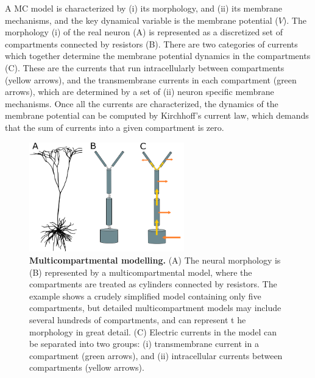 A MC model is characterized by (i) its morphology, and (ii) its membrane mechanisms, and the key dynamical variable is the membrane potential ($V$). The morphology (i) of the real neuron (A) is represented as a discretized set of compartments connected by resistors (B). There are two categories of currents which together determine the membrane potential dynamics in the compartments (C). These are the currents that run intracellularly between compartments (yellow arrows), and the transmembrane currents in each compartment (green arrows), which are determined by a set of (ii) neuron specific membrane mechanisms. Once all the currents are characterized, the dynamics of the membrane potential can be computed by Kirchhoff's current law, which demands that the sum of currents into a given compartment is zero.

\begin{figure}[!ht]
\begin{center}
\includegraphics[width=0.6\textwidth]{Figures/Neuron/multicompartment.png}
\end{center}
\caption{\textbf{Multicompartmental modelling.}  (A) The neural morphology is (B) represented by a multicompartmental model, where the compartments are treated as cylinders connected by resistors. The example shows a crudely simplified model containing only five compartments, but detailed multicompartment models may include several hundreds of compartments, and can represent t he morphology in great detail. (C) Electric currents in the model can be separated into two groups: (i) transmembrane current in a compartment (green arrows), and (ii) intracellular currents between compartments (yellow arrows). 
}
\label{fig:Neuron:multicomp}
\end{figure}

